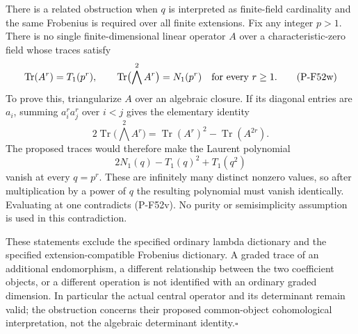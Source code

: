 There is a related obstruction when $q$ is interpreted as
finite-field cardinality and the same Frobenius is required
over all finite extensions. Fix any integer $p>1$. There is
no single finite-dimensional linear operator $A$ over a
characteristic-zero field whose traces satisfy
\[
 \operatorname{Tr}(A^r)=T_1(p^r),\qquad
 \operatorname{Tr}\bigl(\bigwedge^2 A^r\bigr)=N_1(p^r)
                   \quad\hbox{for every }r\ge1.
                                                        \tag{P-F52w}
\]
To prove this, triangularize $A$ over an algebraic closure.
If its diagonal entries are $a_i$, summing
$a_i^r a_j^r$ over $i<j$ gives the elementary identity
\[
 2\operatorname{Tr}\bigl(\bigwedge^2 A^r\bigr)
       =\operatorname{Tr}(A^r)^2-\operatorname{Tr}(A^{2r}).
\]
The proposed traces would therefore make the Laurent
polynomial
\[
       2N_1(q)-T_1(q)^2+T_1(q^2)
                                                        \tag{P-F52x}
\]
vanish at every $q=p^r$. These are infinitely many distinct
nonzero values, so after multiplication by a power of $q$
the resulting polynomial must vanish identically. Evaluating
at one contradicts (P-F52v). No purity or semisimplicity
assumption is used in this contradiction.

These statements exclude the specified ordinary lambda
dictionary and the specified extension-compatible Frobenius
dictionary. A graded trace of an additional endomorphism,
a different relationship between the two coefficient objects,
or a different operation is not identified with an ordinary
graded dimension. In particular the actual central operator
and its determinant remain valid; the obstruction concerns
their proposed common-object cohomological interpretation,
not the algebraic determinant identity.\hfill$\square$
